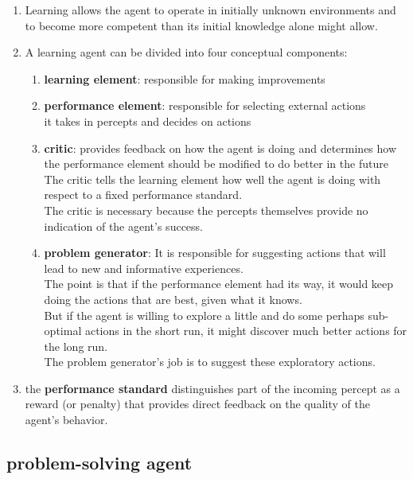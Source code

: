 \begin{enumerate}
    \item Learning allows the agent to operate in initially unknown environments and to become more competent than its initial knowledge alone might allow.

    \item A learning agent can be divided into four conceptual components:
    \begin{enumerate}
        \item \textbf{learning element}: responsible for making improvements

        \item \textbf{performance element}: responsible for selecting external actions\\
        it takes in percepts and decides on actions

        \item \textbf{critic}: provides feedback on how the agent is doing and determines how the performance element should be modified to do better in the future\\
        The critic tells the learning element how well the agent is doing with respect to a fixed performance standard.\\
        The critic is necessary because the percepts themselves provide no indication of the agent’s success.

        \item \textbf{problem generator}: It is responsible for suggesting actions that will lead to new and informative experiences.\\
        The point is that if the performance element had its way, it would keep doing the actions that are best, given what it knows.\\
        But if the agent is willing to explore a little and do some perhaps sub-optimal actions in the short run, it might discover much better actions for the long run.\\
        The problem generator’s job is to suggest these exploratory actions.
    \end{enumerate}

    \item  the \textbf{performance standard} distinguishes part of the
incoming percept as a reward (or penalty) that provides direct feedback on the quality of the
agent’s behavior.    
\end{enumerate}



\subsection{problem-solving agent \cite{aci-1}}

